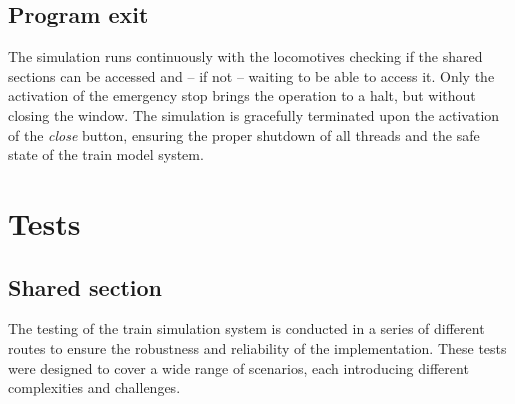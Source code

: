 \documentclass{article}
\begin{document}
    \subsection{Program exit}

    The simulation runs continuously with the locomotives checking if the shared sections can be accessed and -- if not -- waiting to be able to access it. Only the activation of the emergency stop brings the operation to a halt, but without closing the window. The simulation is gracefully terminated upon the activation of the \textit{close} button, ensuring the proper shutdown of all threads and the safe state of the train model system.


    \section{Tests}

    \subsection{Shared section}
    The testing of the train simulation system is conducted in a series of different routes to ensure the robustness and reliability of the implementation. These tests were designed to cover a wide range of scenarios, each introducing different complexities and challenges.
\end{document}
